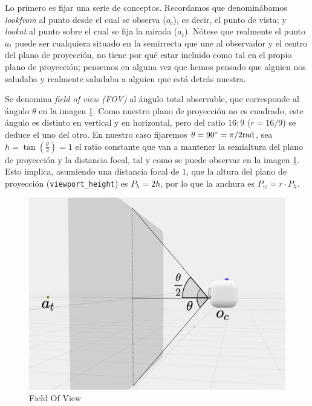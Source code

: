 Lo primero es fijar una serie de conceptos. Recordamos que denominábamos \textit{lookfrom} al punto desde el cual se observa ($o_c$), es decir, el punto de vista; y \textit{lookat} al punto sobre el cual se fija la mirada ($a_t$). Nótese que realmente el punto $a_t$ puede ser cualquiera situado en la semirrecta que une al observador y el centro del plano de proyección, no tiene por qué estar incluido como tal en el propio plano de proyección; pensemos en alguna vez que hemos pensado que alguien nos saludaba y realmente saludaba a alguien que está detrás nuestra.

Se denomina \textit{field of view (FOV)} al ángulo total observable, que corresponde al ángulo $\theta$ en la imagen \ref{fig:fov}. Como nuestro plano de proyección no es cuadrado, este ángulo es distinto en vertical y en horizontal, pero del ratio $16:9$ ($r=16/9$) se deduce el uno del otro. En nuestro caso fijaremos $\theta=90^\circ=\pi/2 \mathrm{rad}$, sea $h=\tan\left(\frac \theta 2\right)=1$ el ratio constante que van a mantener la semialtura del plano de proyección y la distancia focal, tal y como se puede observar en la imagen \ref{fig:fov}. Esto implica, asumiendo una distancia focal de $1$, que la altura del plano de proyección (\verb|viewport_height|) es $P_h=2h$, por lo que la anchura es $P_w=r\cdot P_h$. 

\begin{figure} [ht]
    \centering
    \includegraphics[scale = 0.25]{img/C7/fov.png}
    \caption{Field Of View}
    \label{fig:fov}
\end{figure}

